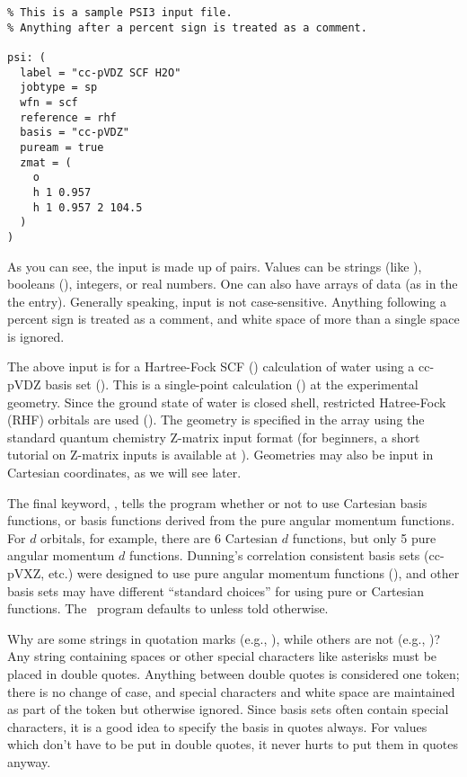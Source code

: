\begin{verbatim}
% This is a sample PSI3 input file.
% Anything after a percent sign is treated as a comment.

psi: (
  label = "cc-pVDZ SCF H2O"
  jobtype = sp
  wfn = scf
  reference = rhf
  basis = "cc-pVDZ"
  puream = true
  zmat = (
    o
    h 1 0.957
    h 1 0.957 2 104.5
  )
)
\end{verbatim}

As you can see, the input is made up of  pairs.  
Values can be strings (like ), booleans 
(), integers, or real numbers.  One can 
also have arrays of data (as in the the  entry).  Generally
speaking, input is not case-sensitive.  Anything following a percent sign
is treated as a comment, and white space of more than a single space is
ignored.  

The above input is for a Hartree-Fock SCF ()
calculation of water using a cc-pVDZ basis set 
().  This is a 
single-point calculation () at the experimental 
geometry.  Since the ground state of water is closed shell, restricted 
Hatree-Fock (RHF) orbitals are used ().  
The geometry is specified in the  array using the
standard quantum chemistry Z-matrix input format (for beginners, a short
tutorial on Z-matrix inputs is available at
).  Geometries
may also be input in Cartesian coordinates, as we will see later.

The final keyword, , tells the program whether or not
to use Cartesian basis functions, or basis functions derived from the
pure angular momentum functions.  For $d$ orbitals, for example, 
there are 6 Cartesian $d$ functions, but only 5 pure angular 
momentum $d$ functions.  Dunning's correlation consistent basis sets
(cc-pVXZ, etc.) were designed to use pure angular momentum functions
(), and other basis sets may have different 
``standard choices'' for using pure or Cartesian functions.  The \PSIthree\ 
program defaults to  unless told otherwise.

Why are some strings in quotation marks (e.g., \keyword{label = "cc-pVDZ
SCF H2O"}), while others are not (e.g., \keyword{wfn = scf})?  Any
string containing spaces or other special characters like asterisks
must be placed in double quotes.  Anything between double quotes is 
considered one token; there is no change of case, and special characters 
and white space are maintained as part of the token but otherwise ignored.
Since basis sets often contain special characters, it is a good idea to 
specify the basis in quotes always.  For values which don't have to be put 
in double quotes, it never hurts to put them in quotes anyway.

